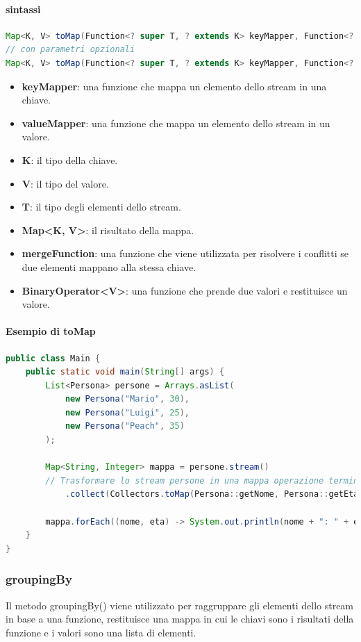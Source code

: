 \documentclass[11pt]{article}
\begin{document}
\paragraph{sintassi}
\begin{lstlisting}[language=Java]
Map<K, V> toMap(Function<? super T, ? extends K> keyMapper, Function<? super T, ? extends V> valueMapper)
// con parametri opzionali
Map<K, V> toMap(Function<? super T, ? extends K> keyMapper, Function<? super T, ? extends V> valueMapper, BinaryOperator<V> mergeFunction)
\end{lstlisting}
\begin{itemize}
    \item \textbf{keyMapper}: una funzione che mappa un elemento dello stream in una chiave.
    \item \textbf{valueMapper}: una funzione che mappa un elemento dello stream in un valore.
    \item \textbf{K}: il tipo della chiave.
    \item \textbf{V}: il tipo del valore.
    \item \textbf{T}: il tipo degli elementi dello stream.
    \item \textbf{Map<K, V>}: il risultato della mappa.
    \item \textbf{mergeFunction}: una funzione che viene utilizzata per risolvere i conflitti se due elementi mappano alla stessa chiave.
    \item \textbf{BinaryOperator<V>}: una funzione che prende due valori e restituisce un valore.
\end{itemize}
\paragraph{Esempio di toMap}
\begin{lstlisting}[language=Java]
public class Main {
    public static void main(String[] args) {
        List<Persona> persone = Arrays.asList(
            new Persona("Mario", 30),
            new Persona("Luigi", 25),
            new Persona("Peach", 35)
        );

        Map<String, Integer> mappa = persone.stream()
        // Trasformare lo stream persone in una mappa operazione terminale
            .collect(Collectors.toMap(Persona::getNome, Persona::getEta));

        mappa.forEach((nome, eta) -> System.out.println(nome + ": " + eta));
    }
}
\end{lstlisting}
\subsubsection{groupingBy}
Il metodo groupingBy() viene utilizzato per raggruppare gli elementi dello stream in base a una funzione, restituisce una mappa in cui le chiavi sono i risultati della funzione e i valori sono una lista di elementi.
\end{document}
